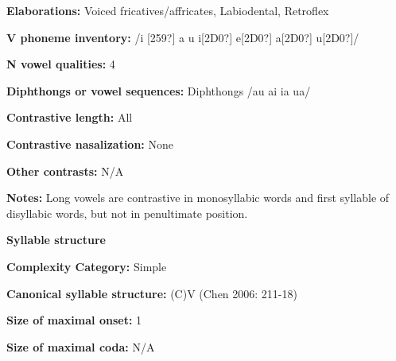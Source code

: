 \begin{styleBody}
\textbf{Elaborations:} Voiced fricatives/affricates, Labiodental, Retroflex
\end{styleBody}

\begin{styleBody}
\textbf{V phoneme inventory:} /i [259?] a u i[2D0?] e[2D0?] a[2D0?] u[2D0?]/
\end{styleBody}

\begin{styleBody}
\textbf{N vowel qualities:} 4
\end{styleBody}

\begin{styleBody}
\textbf{Diphthongs or vowel sequences:} Diphthongs /au ai ia ua/
\end{styleBody}

\begin{styleBody}
\textbf{Contrastive length:} All
\end{styleBody}

\begin{styleBody}
\textbf{Contrastive nasalization:} None
\end{styleBody}

\begin{styleBody}
\textbf{Other contrasts:} N/A
\end{styleBody}

\begin{styleBody}
\textbf{Notes:} Long vowels are contrastive in monosyllabic words and first syllable of disyllabic words, but not in penultimate position.
\end{styleBody}

\begin{styleBody}
\textbf{Syllable structure}
\end{styleBody}

\begin{styleBody}
\textbf{Complexity Category:} Simple
\end{styleBody}

\begin{styleBody}
\textbf{Canonical syllable structure:} (C)V\textbf{ }(Chen 2006: 211-18)
\end{styleBody}

\begin{styleBody}
\textbf{Size of maximal onset:} 1
\end{styleBody}

\begin{styleBody}
\textbf{Size of maximal coda:} N/A
\end{styleBody}

